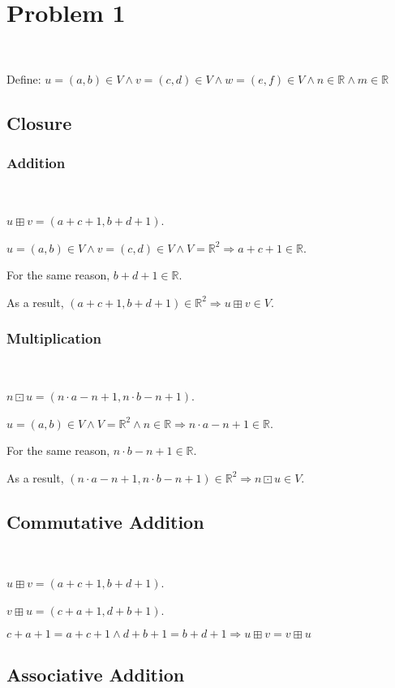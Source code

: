 \documentclass{article}
\def\R{\mathbb{R}}
\begin{document}
\section{Problem 1}

~

Define: $u=(a,b) \in V \land v=(c,d) \in V \land w=(e,f) \in V\land n\in \R \land m \in \R$

\subsection{Closure}

\subsubsection{Addition}

~

$u \boxplus v = (a + c + 1, b + d + 1)$.

$u = (a,b) \in V \land v = (c,d) \in V \land V = \R^2 \Rightarrow a + c + 1 \in \R $. 

For the same reason, $b + d + 1 \in \R $.

As a result, $(a + c + 1, b + d + 1) \in \R^2 \Rightarrow u \boxplus v \in V$.


\subsubsection{Multiplication}

~

$n \boxdot u = (n \cdot a - n + 1, n \cdot b - n + 1)$.

$u = (a,b) \in V \land V = \R^2 \land n \in \R \Rightarrow n \cdot a - n + 1 \in \R $. 

For the same reason, $n \cdot b - n + 1 \in \R$.

As a result, $(n \cdot a - n + 1, n \cdot b - n + 1) \in \R^2 \Rightarrow n \boxdot u \in V$.

\subsection{Commutative Addition}

~

$u \boxplus v = (a + c + 1, b + d + 1)$.

$v \boxplus u = (c + a + 1, d + b + 1)$.

$c+a+1=a+c+1 \land d+b+1=b+d+1 \Rightarrow u \boxplus v=v \boxplus u$

\subsection{Associative Addition}
\end{document}

